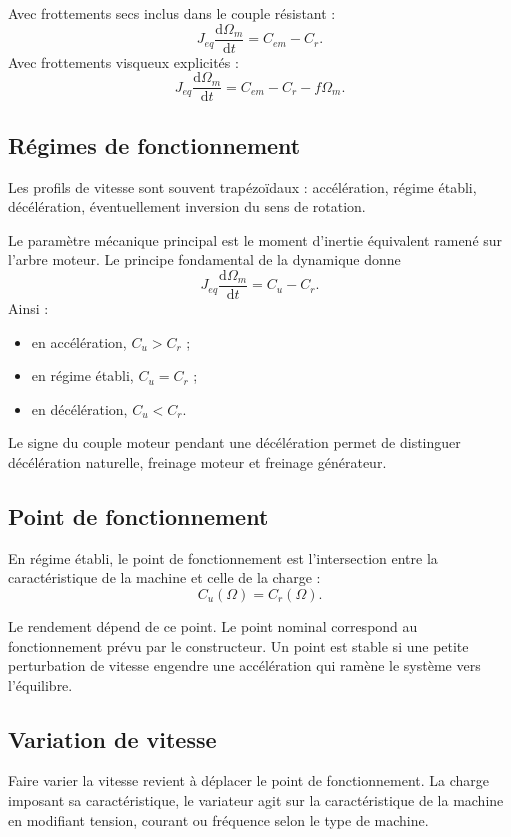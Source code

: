 Avec frottements secs inclus dans le couple résistant :
\[
J_{eq}\frac{\mathrm d\Omega_m}{\mathrm dt}=C_{em}-C_r.
\]
Avec frottements visqueux explicités :
\[
J_{eq}\frac{\mathrm d\Omega_m}{\mathrm dt}=C_{em}-C_r-f\Omega_m.
\]

\subsection{Régimes de fonctionnement}

Les profils de vitesse sont souvent trapézoïdaux : accélération, régime établi, décélération, éventuellement inversion du sens de rotation.

\TLCycleTrapezoidal

Le paramètre mécanique principal est le moment d'inertie équivalent ramené sur l'arbre moteur. Le principe fondamental de la dynamique donne
\[
J_{eq}\frac{\mathrm d\Omega_m}{\mathrm dt}=C_u-C_r.
\]
Ainsi :
\begin{itemize}
  \item en accélération, $C_u>C_r$ ;
  \item en régime établi, $C_u=C_r$ ;
  \item en décélération, $C_u<C_r$.
\end{itemize}
Le signe du couple moteur pendant une décélération permet de distinguer décélération naturelle, freinage moteur et freinage générateur.

\subsection{Point de fonctionnement}

En régime établi, le point de fonctionnement est l'intersection entre la caractéristique de la machine et celle de la charge :
\[
C_u(\Omega)=C_r(\Omega).
\]

\TLPointFonctionnement

Le rendement dépend de ce point. Le point nominal correspond au fonctionnement prévu par le constructeur. Un point est stable si une petite perturbation de vitesse engendre une accélération qui ramène le système vers l'équilibre.

\subsection{Variation de vitesse}

Faire varier la vitesse revient à déplacer le point de fonctionnement. La charge imposant sa caractéristique, le variateur agit sur la caractéristique de la machine en modifiant tension, courant ou fréquence selon le type de machine.

